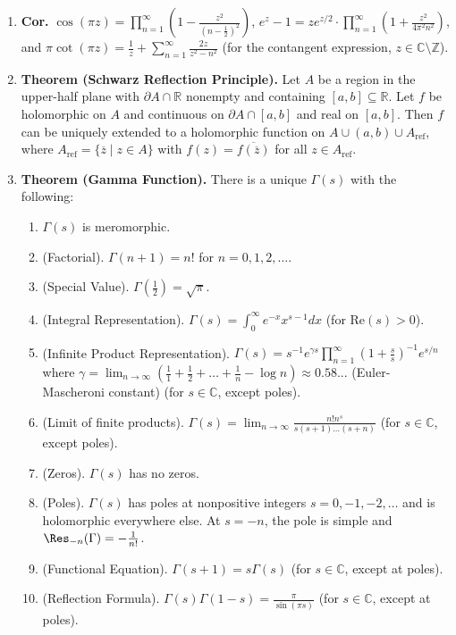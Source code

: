 \begin{enumerate}
    \item \textbf{Cor. } $\cos(\pi z) = \prod_{n=1}^{\infty} \left(1 - \frac{z^2}{\left(n - \frac{1}{2}\right)^2}\right)$, $e^z - 1 = ze^{z/2} \cdot \prod_{n=1}^{\infty} \left(1 + \frac{z^2}{4\pi^2n^2}\right)$, and $\pi\cot(\pi z) = \frac{1}{z} + \sum_{n=1}^{\infty} \frac{2z}{z^2 - n^2}$ (for the contangent expression, $z \in \mathbb{C} \setminus \mathbb{Z}$). 
    \item \textbf{Theorem (Schwarz Reflection Principle). } Let $A$ be a region in the upper-half plane with $\partial A \cap \mathbb{R}$ nonempty and containing $[a,b] \subseteq \mathbb{R}$. Let $f$ be holomorphic on $A$ and continuous on $\partial A \cap [a,b]$ and real on $[a,b]$. Then $f$ can be uniquely extended to a holomorphic function on $A \cup (a,b) \cup A_{\textrm{ref}}$, where $A_{\textrm{ref}} = \{\overline{z} \mid z \in A\}$ with $f(z) = \overline{f(\overline{z})}$ for all $z \in A_{\textrm{ref}}$. 
    \item \textbf{Theorem (Gamma Function). } There is a unique $\Gamma(s)$ with the following: 
    \begin{enumerate}
        \item $\Gamma(s)$ is meromorphic. 
        \item (Factorial). $\Gamma(n+1) = n!$ for $n=0,1,2,\dots$. 
        \item (Special Value). $\Gamma(\frac{1}{2}) = \sqrt{\pi}$. 
        \item (Integral Representation). $\Gamma(s) = \int_{0}^{\infty} e^{-x} x^{s-1} dx$ (for $\textrm{Re}(s) > 0$). 
        \item (Infinite Product Representation). $\Gamma(s) = s^{-1}e^{\gamma s} \prod_{n=1}^{\infty} \left(1 + \frac{s}{s}\right)^{-1} e^{s/n}$ where $\gamma = \lim_{n \to \infty} \left(\frac{1}{1} + \frac{1}{2} + \dots + \frac{1}{n} - \log n\right) \approx 0.58...$ (Euler-Mascheroni constant) (for $s \in \mathbb{C}$, except poles). 
        \item (Limit of finite products). $\Gamma(s) = \lim_{n \to \infty} \frac{n! n^s}{s(s+1)\dots(s+n)}$ (for $s \in \mathbb{C}$, except poles). 
        \item (Zeros). $\Gamma(s)$ has no zeros. 
        \item (Poles). $\Gamma(s)$ has poles at nonpositive integers $s=0,-1,-2,\dots$ and is holomorphic everywhere else. At $s=-n$, the pole is simple and $\Res_{-n}(\Gamma) = -\frac{1}{n!}$. 
        \item (Functional Equation). $\Gamma(s+1) = s\Gamma(s)$ (for $s \in \mathbb{C}$, except at poles). 
        \item (Reflection Formula). $\Gamma(s)\Gamma(1-s) = \frac{\pi}{\sin(\pi s)}$ (for $s \in \mathbb{C}$, except at poles). 
        

\end{enumerate}
\end{enumerate}
